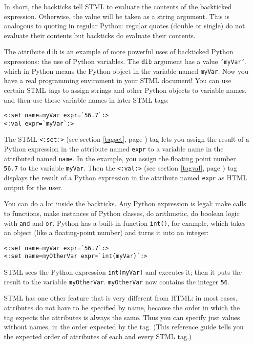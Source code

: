 \documentclass{manual}
\begin{document}
In short, the backticks tell STML to evaluate the contents of the
backticked expression.  Otherwise, the value will be taken as a string
argument.  This is analogous to quoting in regular Python:  regular
quotes (double or single) do not evaluate their contents but backticks
do evaluate their contents.

The attribute \texttt{dib} is an example of more powerful 
uses of backticked Python expressions: the use of Python variables.
The \texttt{dib} argument has a value \texttt{`myVar`}, which in Python means
the Python object in the variable named \texttt{myVar}. Now you have
a real programming enviroment in your STML document!  You can use certain
STML tags to assign strings and other Python objects to variable names,
and then use those variable names in later STML tags:

\begin{verbatim}
<:set name=myVar expr=`56.7`:>
<:val expr=`myVar`:>
\end{verbatim}


The STML \texttt{<:set:>} (see section \ref{tagset}, page
\pageref{tagset}) tag  
lets you assign the result of a Python expression in the attribute
named \texttt{expr} to a variable name in the attributed named \texttt{name}.
In the example, you assign the floating point number 
\texttt{56.7} to the variable \texttt{myVar}. Then the
\texttt{<:val:>} (see section \ref{tagval}, page
\pageref{tagval})
tag displays
the result of a Python expression in the attribute named \texttt{expr}
as HTML output for the user.

You can do a lot inside the backticks. Any Python expression is legal:
make calls to functions, make instances of Python classes, do arithmetic,
do boolean logic with \texttt{and} and \texttt{or}. 
Python has a built-in function \texttt{int()}, for example, which takes 
an object (like a floating-point number) and turns it into an integer: 

\begin{verbatim}
<:set name=myVar expr=`56.7`:>
<:set name=myOtherVar expr=`int(myVar)`:>
\end{verbatim}

STML sees the Python expression \texttt{int(myVar)} and executes it; 
then it puts the result to the variable \texttt{myOtherVar}.
\texttt{myOtherVar} now contains the integer \texttt{56}.

STML has one other feature that is very different from HTML: 
in most cases, attributes do not have to be specified by name,
because the order in which the tag expects the attributes is always the
same. Thus you can specify just values without names, in the order
expected by the tag. (This reference guide tells you the expected order
of attributes of each and every STML tag.)
\end{document}

